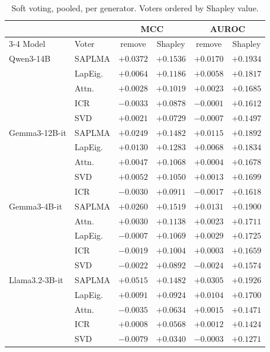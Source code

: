 \begin{table}[h]\centering\footnotesize
  \caption{Soft voting, pooled, per generator. Voters ordered by Shapley value.}
  \begin{tabular}{l l c c c c}
    \hline
    & & \multicolumn{2}{c}{MCC} & \multicolumn{2}{c}{AUROC} \\
    \cline{3-4}\cline{5-6}
    Model & Voter & remove & Shapley & remove & Shapley \\
    \hline
    Qwen3-14B & SAPLMA & $+0.0372$ & $+0.1536$ & $+0.0170$ & $+0.1934$ \\
     & LapEig. & $+0.0064$ & $+0.1186$ & $+0.0058$ & $+0.1817$ \\
     & Attn. & $+0.0028$ & $+0.1019$ & $+0.0023$ & $+0.1685$ \\
     & ICR & $-0.0033$ & $+0.0878$ & $-0.0001$ & $+0.1612$ \\
     & SVD & $+0.0021$ & $+0.0729$ & $-0.0007$ & $+0.1497$ \\
    \hline
    Gemma3-12B-it & SAPLMA & $+0.0249$ & $+0.1482$ & $+0.0115$ & $+0.1892$ \\
     & LapEig. & $+0.0130$ & $+0.1283$ & $+0.0068$ & $+0.1834$ \\
     & Attn. & $+0.0047$ & $+0.1068$ & $+0.0004$ & $+0.1678$ \\
     & SVD & $+0.0052$ & $+0.1050$ & $+0.0013$ & $+0.1699$ \\
     & ICR & $-0.0030$ & $+0.0911$ & $-0.0017$ & $+0.1618$ \\
    \hline
    Gemma3-4B-it & SAPLMA & $+0.0260$ & $+0.1519$ & $+0.0131$ & $+0.1900$ \\
     & Attn. & $+0.0030$ & $+0.1138$ & $+0.0023$ & $+0.1711$ \\
     & LapEig. & $-0.0007$ & $+0.1069$ & $+0.0029$ & $+0.1725$ \\
     & ICR & $-0.0019$ & $+0.1004$ & $+0.0003$ & $+0.1659$ \\
     & SVD & $-0.0022$ & $+0.0892$ & $-0.0024$ & $+0.1574$ \\
    \hline
    Llama3.2-3B-it & SAPLMA & $+0.0515$ & $+0.1482$ & $+0.0305$ & $+0.1926$ \\
     & LapEig. & $+0.0091$ & $+0.0924$ & $+0.0104$ & $+0.1700$ \\
     & Attn. & $-0.0035$ & $+0.0634$ & $+0.0015$ & $+0.1471$ \\
     & ICR & $+0.0008$ & $+0.0568$ & $+0.0012$ & $+0.1424$ \\
     & SVD & $-0.0079$ & $+0.0340$ & $-0.0003$ & $+0.1271$ \\

\end{tabular}
\end{table}

